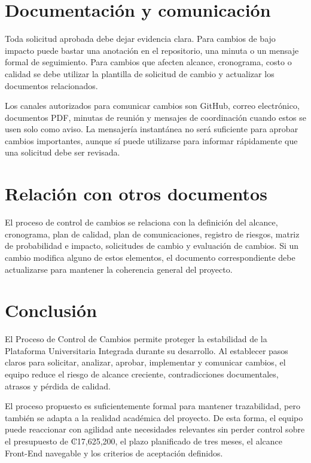 \documentclass[11pt,spanish]{article}
\begin{document}
\section{Documentación y comunicación}

Toda solicitud aprobada debe dejar evidencia clara. Para cambios de bajo impacto puede bastar una anotación en el repositorio, una minuta o un mensaje formal de seguimiento. Para cambios que afecten alcance, cronograma, costo o calidad se debe utilizar la plantilla de solicitud de cambio y actualizar los documentos relacionados.

Los canales autorizados para comunicar cambios son GitHub, correo electrónico, documentos PDF, minutas de reunión y mensajes de coordinación cuando estos se usen solo como aviso. La mensajería instantánea no será suficiente para aprobar cambios importantes, aunque sí puede utilizarse para informar rápidamente que una solicitud debe ser revisada.

\section{Relación con otros documentos}

El proceso de control de cambios se relaciona con la definición del alcance, cronograma, plan de calidad, plan de comunicaciones, registro de riesgos, matriz de probabilidad e impacto, solicitudes de cambio y evaluación de cambios. Si un cambio modifica alguno de estos elementos, el documento correspondiente debe actualizarse para mantener la coherencia general del proyecto.

\section{Conclusión}

El Proceso de Control de Cambios permite proteger la estabilidad de la Plataforma Universitaria Integrada durante su desarrollo. Al establecer pasos claros para solicitar, analizar, aprobar, implementar y comunicar cambios, el equipo reduce el riesgo de alcance creciente, contradicciones documentales, atrasos y pérdida de calidad.

El proceso propuesto es suficientemente formal para mantener trazabilidad, pero también se adapta a la realidad académica del proyecto. De esta forma, el equipo puede reaccionar con agilidad ante necesidades relevantes sin perder control sobre el presupuesto de ₡17,625,200, el plazo planificado de tres meses, el alcance Front-End navegable y los criterios de aceptación definidos.
\end{document}
